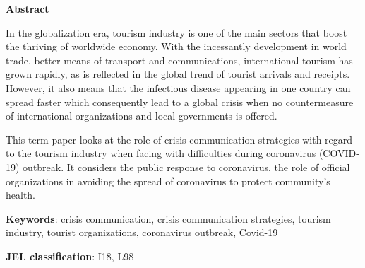 \thispagestyle{plain}
\textbf{Abstract}

In the globalization era, tourism industry is one of the main sectors that boost the thriving of worldwide economy. With the incessantly development in world trade, better means of transport and communications, international tourism has grown rapidly, as is reflected in the global trend of tourist arrivals and receipts. However, it also means that the infectious disease appearing in one country can spread faster which consequently lead to a global crisis when no countermeasure of international organizations and local governments is offered.

This term paper looks at the role of crisis communication strategies with regard to the tourism industry when facing with difficulties during coronavirus (COVID-19) outbreak. It considers the public response to coronavirus, the role of official organizations in avoiding the spread of coronavirus to protect community’s health.

\vspace{2cm}
\textbf{Keywords}: crisis communication, crisis communication strategies, tourism industry, tourist organizations, coronavirus outbreak, Covid-19

\vspace{1cm}
\textbf{JEL classification}: I18, L98
